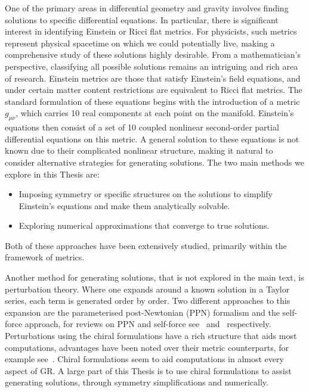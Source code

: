 \documentclass[10pt]{report}
\theoremstyle{definition}
\begin{document}
One of the primary areas in differential geometry and gravity involves finding solutions to specific differential equations. In particular, there is significant interest in identifying Einstein or Ricci flat metrics. For physicists, such metrics represent physical spacetime on which we could potentially live, making a comprehensive study of these solutions highly desirable. From a mathematician's perspective, classifying all possible solutions remains an intriguing and rich area of research. Einstein metrics are those that satisfy Einstein's field equations, and under certain matter content restrictions are equivalent to Ricci flat metrics. The standard formulation of these equations begins with the introduction of a metric $g_{\mu\nu}$, which carries 10 real components at each point on the manifold. Einstein's equations then consist of a set of 10 coupled nonlinear second-order partial differential equations on this metric. A general solution to these equations is not known due to their complicated nonlinear structure, making it natural to consider alternative strategies for generating solutions. The two main methods we explore in this Thesis are:
\begin{itemize}
	\item Imposing symmetry or specific structures on the solutions to simplify Einstein's equations and make them analytically solvable.
	\item Exploring numerical approximations that converge to true solutions.
\end{itemize}
Both of these approaches have been extensively studied, primarily within the framework of metrics. 

Another method for generating solutions, that is not explored in the main text, is perturbation theory. Where one expands around a known solution in a Taylor series, each term is generated order by order. Two different approaches to this expansion are the parameterised post-Newtonian (PPN) formalism and the self-force approach, for reviews on PPN and self-force see~\cite{Theory_and_Expe_Will_2018} and~\cite{Motion_of_small_Pound_2015} respectively. Perturbations using the chiral formulations have a rich structure that aids most computations, advantages have been noted over their metric counterparts, for example see~\cite{ChiralPerturbaKrasno2020,Pure_connection_Krasno_2024}. Chiral formulations seem to aid computations in almost every aspect of GR. A large part of this Thesis is to use chiral formulations to assist generating solutions, through symmetry simplifications and numerically.
\end{document}

